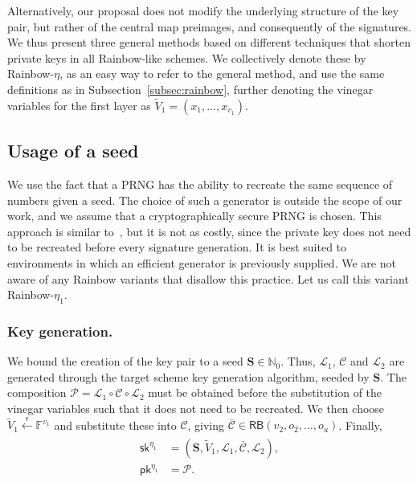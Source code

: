 \documentclass[12pt, a4paper, oneside]{memoir}
\newcommand{\random}{\overset{\mathsf{r}}{\gets}}
\theoremstyle{definition}
\begin{document}
Alternatively, our proposal does not modify the underlying structure of the key pair, but rather of the central map preimages, and consequently of the signatures. We thus present three general methods based on different techniques that shorten private keys in all Rainbow-like schemes. We collectively denote these by Rainbow-$\eta$, as an easy way to refer to the general method, and use the same definitions as in Subsection~\ref{subsec:rainbow}, further denoting the vinegar variables for the first layer as $\widetilde{V}_{1} = (x_{1}, \dots, x_{v_{1}})$.

\subsection{Usage of a seed}

We use the fact that a PRNG has the ability to recreate the same sequence of numbers given a seed. The choice of such a generator is outside the scope of our work, and we assume that a cryptographically secure PRNG is chosen. This approach is similar to~\cite{Shim:201512}, but it is not as costly, since the private key does not need to be recreated before every signature generation. It is best suited to environments in which an efficient generator is previously supplied. We are not aware of any Rainbow variants that disallow this practice. Let us call this variant Rainbow-$\eta_{1}$.

\subsubsection{Key generation.}

We bound the creation of the key pair to a seed $\mathbf{S} \in \mathbb{N}_{0}$. Thus, $\mathcal{L}_{1}$, $\mathcal{C}$ and $\mathcal{L}_{2}$ are generated through the target scheme key generation algorithm, seeded by $\mathbf{S}$. The composition $\mathcal{P} = \mathcal{L}_{1} \circ \mathcal{C} \circ \mathcal{L}_{2}$ must be obtained before the substitution of the vinegar variables such that it does not need to be recreated. We then choose $\widetilde{V}_{1} \random \mathbb{F}^{v_{1}}$ and substitute these into $\mathcal{C}$, giving $\overline{\mathcal{C}} \in \mathsf{RB}(v_{2}, o_{2}, \dots, o_{u})$. Finally,
\begin{align}
  \begin{split}
    \mathsf{sk}^{\eta_{1}} &= (\mathbf{S}, \widetilde{V}_{1}, \mathcal{L}_{1}, \overline{\mathcal{C}}, \mathcal{L}_{2}), \\
    \mathsf{pk}^{\eta_{1}} &= \mathcal{P}.
  \end{split}
\end{align}
\end{document}
